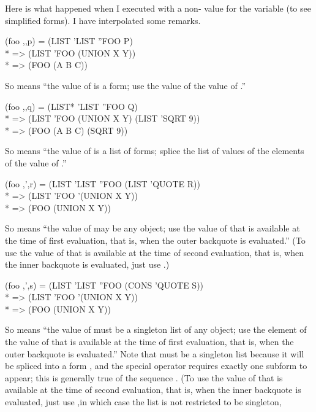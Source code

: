 \begin{new}
Here is what happened when I executed  with
a non- value for the variable  (to see
simplified forms).  I have interpolated some remarks.
\begin{lisp}
{\Xbq}{\Xbq}(foo ,,p) = (LIST 'LIST ''FOO P) \\*
 => (LIST 'FOO (UNION X Y)) \\*
 => (FOO (A B C))
\end{lisp}
So  means ``the value of  is a form;
use the value of the value of .''
\begin{lisp}
{\Xbq}{\Xbq}(foo ,,{\Xatsign}q) = (LIST* 'LIST ''FOO Q) \\*
 => (LIST 'FOO (UNION X Y) (LIST 'SQRT 9)) \\*
 => (FOO (A B C) (SQRT 9))
\end{lisp}
So  means ``the value of  is a list of forms;
splice the list of values of the elements of the value of .''
\begin{lisp}
{\Xbq}{\Xbq}(foo ,',r) = (LIST 'LIST ''FOO (LIST 'QUOTE R)) \\*
 => (LIST 'FOO '(UNION X Y)) \\*
 => (FOO (UNION X Y))
\end{lisp}
So  means ``the value of  may be any object;
use the value of 
that is available at the time of first evaluation,
that is, when the outer backquote is evaluated.''
(To use the value of  that is available at the time of second evaluation,
that is, when the inner backquote is evaluated,
just use .)
\begin{lisp}
{\Xbq}{\Xbq}(foo ,',{\Xatsign}s) = (LIST 'LIST ''FOO (CONS 'QUOTE S)) \\*
 => (LIST 'FOO '(UNION X Y)) \\*
 => (FOO (UNION X Y))
\end{lisp}
So  means ``the value of  must be a singleton list of any object;
use the element of the value of 
that is available at the time of first evaluation,
that is, when the outer backquote is evaluated.''
Note that  must be a singleton list because it will be spliced
into a form , and the  special operator requires exactly
one subform to appear; this is generally true of the sequence .
(To use the value of  that is available at the time of second evaluation,
that is, when the inner backquote is evaluated,
just use ,in which case the list  is not restricted to be singleton,

\end{new}
